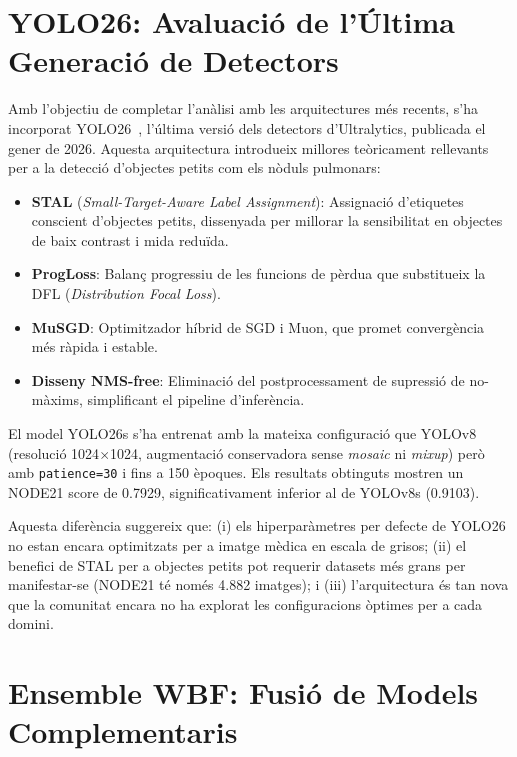 \section{YOLO26: Avaluació de l'Última Generació de Detectors}

Amb l'objectiu de completar l'anàlisi amb les arquitectures més recents, s'ha incorporat YOLO26~\cite{yolo26}, l'última versió dels detectors d'Ultralytics, publicada el gener de 2026. Aquesta arquitectura introdueix millores teòricament rellevants per a la detecció d'objectes petits com els nòduls pulmonars:

\begin{itemize}
    \item \textbf{STAL} (\textit{Small-Target-Aware Label Assignment}): Assignació d'etiquetes conscient d'objectes petits, dissenyada per millorar la sensibilitat en objectes de baix contrast i mida reduïda.
    \item \textbf{ProgLoss}: Balanç progressiu de les funcions de pèrdua que substitueix la DFL (\textit{Distribution Focal Loss}).
    \item \textbf{MuSGD}: Optimitzador híbrid de SGD i Muon, que promet convergència més ràpida i estable.
    \item \textbf{Disseny NMS-free}: Eliminació del postprocessament de supressió de no-màxims, simplificant el pipeline d'inferència.
\end{itemize}

El model YOLO26s s'ha entrenat amb la mateixa configuració que YOLOv8 (resolució 1024$\times$1024, augmentació conservadora sense \textit{mosaic} ni \textit{mixup}) però amb \texttt{patience=30} i fins a 150 èpoques. Els resultats obtinguts mostren un NODE21 score de 0.7929, significativament inferior al de YOLOv8s (0.9103).

Aquesta diferència suggereix que: (i) els hiperparàmetres per defecte de YOLO26 no estan encara optimitzats per a imatge mèdica en escala de grisos; (ii) el benefici de STAL per a objectes petits pot requerir datasets més grans per manifestar-se (NODE21 té només 4.882 imatges); i (iii) l'arquitectura és tan nova que la comunitat encara no ha explorat les configuracions òptimes per a cada domini.

\section{Ensemble WBF: Fusió de Models Complementaris}

